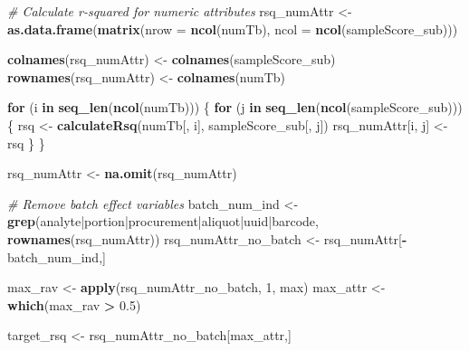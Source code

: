 \documentclass[
]{article}
\newenvironment{Shaded}{\begin{snugshade}}{\end{snugshade}}
\newcommand{\AttributeTok}[1]{\textcolor[rgb]{0.13,0.29,0.53}{#1}}
\newcommand{\CommentTok}[1]{\textcolor[rgb]{0.56,0.35,0.01}{\textit{#1}}}
\newcommand{\ControlFlowTok}[1]{\textcolor[rgb]{0.13,0.29,0.53}{\textbf{#1}}}
\newcommand{\DecValTok}[1]{\textcolor[rgb]{0.00,0.00,0.81}{#1}}
\newcommand{\FloatTok}[1]{\textcolor[rgb]{0.00,0.00,0.81}{#1}}
\newcommand{\FunctionTok}[1]{\textcolor[rgb]{0.13,0.29,0.53}{\textbf{#1}}}
\newcommand{\NormalTok}[1]{#1}
\newcommand{\OtherTok}[1]{\textcolor[rgb]{0.56,0.35,0.01}{#1}}
\newcommand{\SpecialCharTok}[1]{\textcolor[rgb]{0.81,0.36,0.00}{\textbf{#1}}}
\newcommand{\StringTok}[1]{\textcolor[rgb]{0.31,0.60,0.02}{#1}}
\begin{document}
\begin{Shaded}
\begin{Highlighting}[]
\CommentTok{\# Calculate r{-}squared for numeric attributes}
\NormalTok{rsq\_numAttr }\OtherTok{\textless{}{-}} \FunctionTok{as.data.frame}\NormalTok{(}\FunctionTok{matrix}\NormalTok{(}\AttributeTok{nrow =} \FunctionTok{ncol}\NormalTok{(numTb),}
                                    \AttributeTok{ncol =} \FunctionTok{ncol}\NormalTok{(sampleScore\_sub)))}

\FunctionTok{colnames}\NormalTok{(rsq\_numAttr) }\OtherTok{\textless{}{-}} \FunctionTok{colnames}\NormalTok{(sampleScore\_sub)}
\FunctionTok{rownames}\NormalTok{(rsq\_numAttr) }\OtherTok{\textless{}{-}} \FunctionTok{colnames}\NormalTok{(numTb)}

\ControlFlowTok{for}\NormalTok{ (i }\ControlFlowTok{in} \FunctionTok{seq\_len}\NormalTok{(}\FunctionTok{ncol}\NormalTok{(numTb))) \{}
  \ControlFlowTok{for}\NormalTok{ (j }\ControlFlowTok{in} \FunctionTok{seq\_len}\NormalTok{(}\FunctionTok{ncol}\NormalTok{(sampleScore\_sub))) \{}
\NormalTok{    rsq }\OtherTok{\textless{}{-}} \FunctionTok{calculateRsq}\NormalTok{(numTb[, i], sampleScore\_sub[, j])}
\NormalTok{    rsq\_numAttr[i, j] }\OtherTok{\textless{}{-}}\NormalTok{ rsq}
\NormalTok{  \}}
\NormalTok{\}}

\NormalTok{rsq\_numAttr }\OtherTok{\textless{}{-}} \FunctionTok{na.omit}\NormalTok{(rsq\_numAttr)}
\end{Highlighting}
\end{Shaded}

\begin{Shaded}
\begin{Highlighting}[]
\CommentTok{\# Remove batch effect variables}
\NormalTok{batch\_num\_ind }\OtherTok{\textless{}{-}} \FunctionTok{grep}\NormalTok{(}\StringTok{\textquotesingle{}analyte|portion|procurement|aliquot|uuid|barcode\textquotesingle{}}\NormalTok{,}
                  \FunctionTok{rownames}\NormalTok{(rsq\_numAttr))}
\NormalTok{rsq\_numAttr\_no\_batch }\OtherTok{\textless{}{-}}\NormalTok{ rsq\_numAttr[}\SpecialCharTok{{-}}\NormalTok{batch\_num\_ind,]}
\end{Highlighting}
\end{Shaded}

\begin{Shaded}
\begin{Highlighting}[]
\NormalTok{max\_rav }\OtherTok{\textless{}{-}} \FunctionTok{apply}\NormalTok{(rsq\_numAttr\_no\_batch, }\DecValTok{1}\NormalTok{, max)}
\NormalTok{max\_attr }\OtherTok{\textless{}{-}} \FunctionTok{which}\NormalTok{(max\_rav }\SpecialCharTok{\textgreater{}} \FloatTok{0.5}\NormalTok{)}

\NormalTok{target\_rsq }\OtherTok{\textless{}{-}}\NormalTok{ rsq\_numAttr\_no\_batch[max\_attr,]}
\end{Highlighting}
\end{Shaded}
\end{document}
